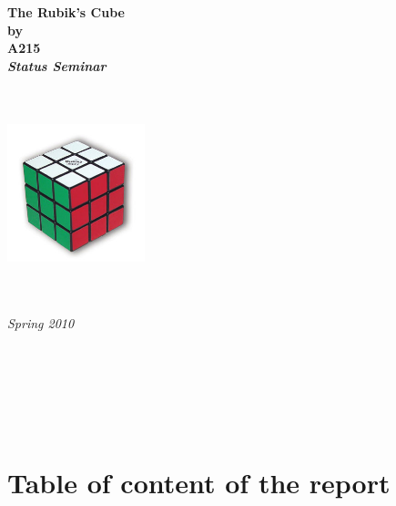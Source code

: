 \documentclass{article}
\begin{document}
\thispagestyle{empty}
\begin{center}        %
  \vspace{5mm}          %
  \LARGE
  \textbf{The Rubik's Cube} \\
  \Large
  \vspace{5mm}
  \textbf{by} \\
  \vspace{5mm}
  \large
  \textbf{A215} \\
  \vspace{10mm}
  \Large
  {\bf{\textsl{Status Seminar}}} \\
   \vspace{2mm}
  {\bf{\textsl{}}} \\
  \vspace{5mm}
  {\large \textsl {}}\\
  
  
  \vspace{10mm}
  \centerline{\includegraphics[width=4cm,height=4cm]{input/pics/rubiksCube}}
  \vspace{5mm}
  \textsl{} \\
  \textsl{} \\
  \vspace{10mm}
  \large
  \textsl{Spring 2010} \\
  \vspace{5mm}
  \normalsize
  \textsl{} \\
  \textsl{} \\
\end{center}

\ \pagebreak{}

\tableofcontents

\ \pagebreak{}
\section{Table of content of the report}
\end{document}
